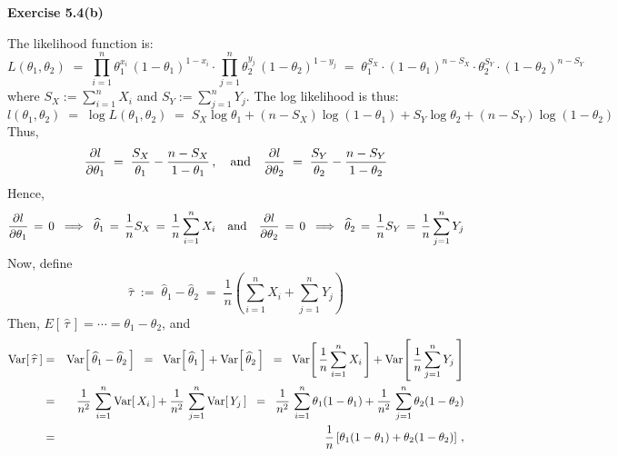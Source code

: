 \vskip 1.0cm
\noindent
\textbf{Exercise 5.4(b)}

\vskip 0.3cm
\noindent
The likelihood function is:
\begin{equation*}
L(\theta_{1},\theta_{2})
\;=\; \prod_{i=1}^{n}\theta_{1}^{x_{i}}\,(1-\theta_{1})^{1-x_{i}} \cdot \prod_{j=1}^{n}\theta_{2}^{y_{j}}\,(1-\theta_{2})^{1-y_{j}}
\;=\; \theta_{1}^{S_{X}}\cdot(1-\theta_{1})^{n - S_{X}}\cdot\theta_{2}^{S_{Y}}\cdot(1-\theta_{2})^{n - S_{Y}}
\end{equation*}
where $S_{X} := \sum_{i=1}^{n}X_{i}$ and $S_{Y} := \sum_{j=1}^{n}Y_{j}$.
The log likelihood is thus:
\begin{equation*}
l(\theta_{1},\theta_{2})
\;=\; \log L(\theta_{1},\theta_{2})
\;=\; S_{X}\log\theta_{1} + (n - S_{X})\log(1-\theta_{1}) + S_{Y}\log\theta_{2} + (n - S_{Y})\log(1-\theta_{2})
\end{equation*}
Thus,
\begin{equation*}
\dfrac{\partial l}{\partial\theta_{1}} \;=\; \dfrac{S_{X}}{\theta_{1}} - \dfrac{n - S_{X}}{1-\theta_{1}}\,,
\quad\textnormal{and}\quad
\dfrac{\partial l}{\partial\theta_{2}} \;=\; \dfrac{S_{Y}}{\theta_{2}} - \dfrac{n - S_{Y}}{1-\theta_{2}}
\end{equation*}
Hence,
\begin{equation*}
\dfrac{\partial l}{\partial\theta_{1}} \,=\, 0
\;\;\Longrightarrow\;\;
\widehat{\theta}_{1} \,=\, \dfrac{1}{n}S_{X} \,=\, \dfrac{1}{n}\sum_{i=1}^{n}X_{i}
\quad\textnormal{and}\quad
\dfrac{\partial l}{\partial\theta_{2}} \,=\, 0
\;\;\Longrightarrow\;\;
\widehat{\theta}_{2} \,=\, \dfrac{1}{n}S_{Y} \,=\, \dfrac{1}{n}\sum_{j=1}^{n}Y_{j}
\end{equation*}
Now, define
\begin{equation*}
\widehat{\tau}
\;:=\; \widehat{\theta}_{1} - \widehat{\theta}_{2}
\;=\; \dfrac{1}{n}\left(\sum_{i=1}^{n}X_{i}+\sum_{j=1}^{n}Y_{j}\right)
\end{equation*}
Then, $E\!\left[\,\widehat{\tau}\,\right] = \cdots = \theta_{1} - \theta_{2}$, and
\begin{eqnarray*}
\textnormal{Var}\!\left[\,\widehat{\tau}\,\right]
&=& \textnormal{Var}\!\left[\,\widehat{\theta}_{1} - \widehat{\theta}_{2}\,\right]
\;\;=\;\; \textnormal{Var}\!\left[\,\widehat{\theta}_{1}\,\right] + \textnormal{Var}\!\left[\,\widehat{\theta}_{2}\,\right]
\;\;=\;\; \textnormal{Var}\!\left[\,\dfrac{1}{n}\sum_{i=1}^{n}X_{i}\,\right] + \textnormal{Var}\!\left[\,\dfrac{1}{n}\sum_{j=1}^{n}Y_{j}\,\right]
\\
&=& \dfrac{1}{n^{2}}\,\sum_{i=1}^{n}\textnormal{Var}\!\left[\,X_{i}\,\right] + \dfrac{1}{n^{2}}\,\sum_{j=1}^{n}\textnormal{Var}\!\left[\,Y_{j}\,\right]
\;\;=\;\; \dfrac{1}{n^{2}}\,\sum_{i=1}^{n}\theta_{1}(1-\theta_{1}) + \dfrac{1}{n^{2}}\,\sum_{j=1}^{n}\theta_{2}(1-\theta_{2})
\\
&=& \dfrac{1}{n}\left[\theta_{1}(1-\theta_{1}) + \theta_{2}(1-\theta_{2})\right]\,,
\end{eqnarray*}
